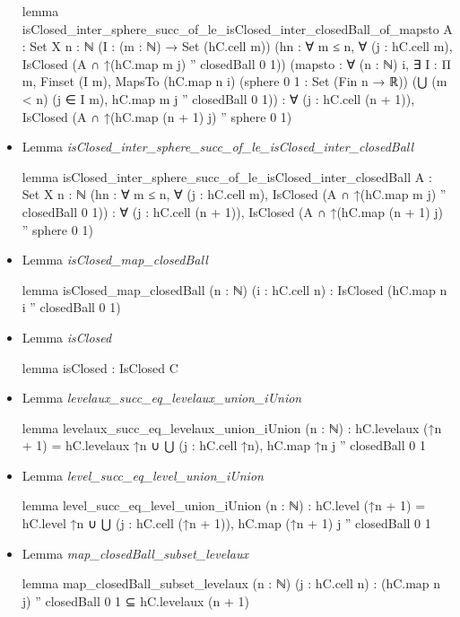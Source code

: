 \documentclass[colorinlistoftodos]{article}
\begin{document}
\begin{itemize}
\begin{leancode}
lemma isClosed_inter_sphere_succ_of_le_isClosed_inter_closedBall_of_mapsto
{A : Set X} {n : ℕ} (I : (m : ℕ) → Set (hC.cell m))
(hn : ∀ m ≤ n, ∀ (j : hC.cell m), IsClosed (A ∩ ↑(hC.map m j) '' closedBall 0 1))
(mapsto : ∀ (n : ℕ) i, ∃ I : Π m, Finset (I m),
MapsTo (hC.map n i) (sphere 0 1 : Set (Fin n → ℝ))
(⋃ (m < n) (j ∈ I m), hC.map m j '' closedBall 0 1)) :
  ∀ (j : hC.cell (n + 1)), IsClosed (A ∩ ↑(hC.map (n + 1) j) '' sphere 0 1)
\end{leancode}
  \item Lemma \emph{isClosed\_inter\_sphere\_succ\_of\_le\_isClosed\_inter\_closedBall}
\begin{leancode}
  lemma isClosed_inter_sphere_succ_of_le_isClosed_inter_closedBall
  {A : Set X} {n : ℕ}
  (hn : ∀ m ≤ n, ∀ (j : hC.cell m), IsClosed (A ∩ ↑(hC.map m j) '' closedBall 0 1)) : 
  ∀ (j : hC.cell (n + 1)), IsClosed (A ∩ ↑(hC.map (n + 1) j) '' sphere 0 1)
\end{leancode}
  \item Lemma \emph{isClosed\_map\_closedBall}
\begin{leancode}
lemma isClosed_map_closedBall (n : ℕ) (i : hC.cell n) : 
  IsClosed (hC.map n i '' closedBall 0 1)
\end{leancode}
  \item Lemma \emph{isClosed}
\begin{leancode}
lemma isClosed : IsClosed C
\end{leancode}
  \item Lemma \emph{levelaux\_succ\_eq\_levelaux\_union\_iUnion}
\begin{leancode}
lemma levelaux_succ_eq_levelaux_union_iUnion (n : ℕ) : 
  hC.levelaux (↑n + 1) = hC.levelaux ↑n ∪ ⋃ (j : hC.cell ↑n), hC.map ↑n j '' closedBall 0 1
\end{leancode}
  \item Lemma \emph{level\_succ\_eq\_level\_union\_iUnion}
\begin{leancode}
lemma level_succ_eq_level_union_iUnion (n : ℕ) : 
  hC.level (↑n + 1) = 
  hC.level ↑n ∪ ⋃ (j : hC.cell (↑n + 1)), hC.map (↑n + 1) j '' closedBall 0 1
\end{leancode}
  \item Lemma \emph{map\_closedBall\_subset\_levelaux}
\begin{leancode}
lemma map_closedBall_subset_levelaux (n : ℕ) (j : hC.cell n) : 
  (hC.map n j) '' closedBall 0 1 ⊆ hC.levelaux (n + 1)
\end{leancode}

\end{itemize}
\end{document}
